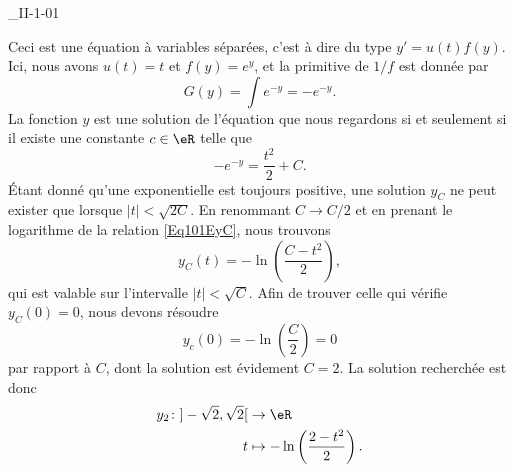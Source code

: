 

\begin{corrige}{_II-1-01}

Ceci est une équation à variables séparées, c'est à dire du type $y'=u(t)f(y)$. Ici, nous avons $u(t)=t$ et $f(y)= e^{y}$, et la primitive de $1/f$ est donnée par
\begin{equation}
	G(y)=\int e^{-y}=- e^{-y}.
\end{equation}
La fonction $y$ est une solution de l'équation que nous regardons si et seulement si il existe une constante $c\in\eR$ telle que
\begin{equation}		\label{Eq101EyC}
	- e^{-y}=\frac{ t^2 }{ 2 }+C.
\end{equation}
Étant donné qu'une exponentielle est toujours positive, une solution $y_C$ ne peut exister que lorsque $| t |<\sqrt{2C}$. En renommant $C\to C/2$ et en prenant le logarithme de la relation \eqref{Eq101EyC}, nous trouvons
\begin{equation}
	y_C(t)=-\ln\left( \frac{ C-t^2 }{ 2 } \right),
\end{equation}
qui est valable sur l'intervalle $| t |<\sqrt{C}$. Afin de trouver celle qui vérifie $y_C(0)=0$, nous devons résoudre
\begin{equation}
	y_c(0)=-\ln\left( \frac{ C }{ 2 } \right)=0
\end{equation}
par rapport à $C$, dont la solution est évidement $C=2$. La solution recherchée est donc
\begin{equation}
	\begin{aligned}
		y_2\colon ]-\sqrt{2},\sqrt{2}[&\to \eR \\
		t&\mapsto -\ln\left( \frac{ 2-t^2 }{2} \right).
	\end{aligned}
\end{equation}

\end{corrige}
